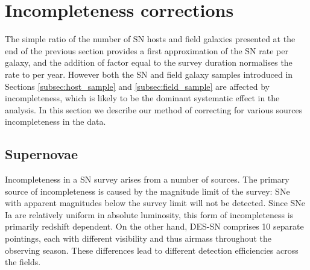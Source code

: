\documentclass[fleqn,usenatbib]{mnras}
\begin{document}
\section{Incompleteness corrections}
\label{sec:incompleteness}
The simple ratio of the number of SN hosts and field galaxies presented at the end of the previous section provides a first approximation of the SN rate per galaxy, and the addition of factor equal to the survey duration normalises the rate to per year. However both the SN and field galaxy samples introduced in Sections \ref{subsec:host_sample} and \ref{subsec:field_sample} are affected by incompleteness, which is likely to be the dominant systematic effect in the analysis. In this section we describe our method of correcting for various sources incompleteness in the data.

\subsection{Supernovae \label{subsec:incompleteness_SNe}}

Incompleteness in a SN survey arises from a number of sources. The primary source of incompleteness is caused by the magnitude limit of the survey: SNe with apparent magnitudes below the survey limit will not be detected. Since SNe Ia are relatively uniform in absolute luminosity, this form of incompleteness is primarily redshift dependent. On the other hand, DES-SN comprises 10 separate pointings, each with different visibility and thus airmass throughout the observing season. These differences lead to different detection efficiencies across the fields.
\end{document}
